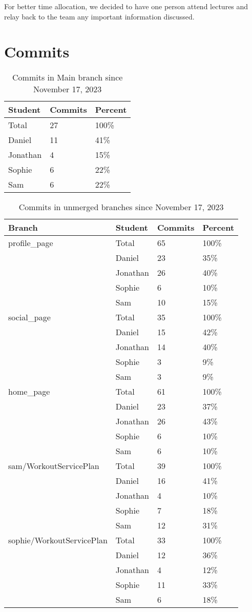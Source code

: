 \documentclass{article}
\begin{document}
For better time allocation, we decided to have one person attend lectures and relay back to the team any important information discussed.

\section{Commits}

\begin{table}[H]
\centering
\begin{tabular}{lll}
\toprule
\textbf{Student} & \textbf{Commits} & \textbf{Percent}\\
\midrule
Total & 27 & 100\% \\
Daniel & 11 & 41\% \\
Jonathan & 4 & 15\% \\
Sophie & 6 & 22\% \\
Sam & 6 & 22\% \\
\bottomrule
\end{tabular}
\caption{Commits in Main branch since November 17, 2023}
\end{table}

\begin{table}[H]
\centering
\begin{tabular}{llll}
\toprule
\textbf{Branch} & \textbf{Student} & \textbf{Commits} & \textbf{Percent}\\
\midrule
profile\_page & Total & 65 & 100\% \\
& Daniel & 23 & 35\% \\
& Jonathan & 26 & 40\% \\
& Sophie & 6 & 10\% \\
& Sam & 10 & 15\% \\
\hline
social\_page & Total & 35 & 100\% \\
& Daniel & 15 & 42\% \\
& Jonathan & 14 & 40\% \\
& Sophie & 3 & 9\% \\
& Sam & 3 & 9\% \\
\hline
home\_page & Total & 61 & 100\% \\
& Daniel & 23 & 37\% \\
& Jonathan & 26 & 43\% \\
& Sophie & 6 & 10\% \\
& Sam & 6 & 10\% \\
\hline
sam/WorkoutServicePlan & Total & 39 & 100\% \\
& Daniel & 16 & 41\% \\
& Jonathan & 4 & 10\% \\
& Sophie & 7 & 18\% \\
& Sam & 12 & 31\% \\
\hline
sophie/WorkoutServicePlan & Total & 33 & 100\% \\
& Daniel & 12 & 36\% \\
& Jonathan & 4 & 12\% \\
& Sophie & 11 & 33\% \\
& Sam & 6 & 18\% \\
\bottomrule
\end{tabular}
\caption{Commits in unmerged branches since November 17, 2023}
\end{table}
\end{document}
